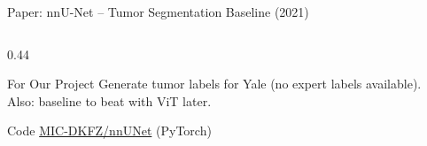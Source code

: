 \documentclass[aspectratio=169,xcolor=dvipsnames]{beamer}
\begin{document}
\begin{frame}{Paper: nnU-Net -- Tumor Segmentation Baseline (2021)}
\begin{columns}
\begin{column}{0.44\textwidth}
            \vspace{0.2em}

            \begin{alertblock}{For Our Project}
                \small
                Generate tumor labels for Yale (no expert labels available).\\
                Also: baseline to beat with ViT later.
            \end{alertblock}

            \begin{exampleblock}{\scriptsize {} Code}
                \scriptsize \href{https://github.com/MIC-DKFZ/nnUNet}{MIC-DKFZ/nnUNet} (PyTorch)
            \end{exampleblock}
        \end{column}
    \end{columns}
\end{frame}
\end{document}
